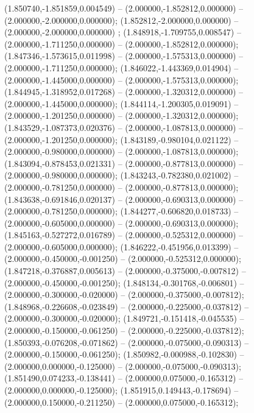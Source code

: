  (1.850740,-1.851859,0.004549) -- (2.000000,-1.852812,0.000000) -- (2.000000,-2.000000,0.000000);
 (1.852812,-2.000000,0.000000) -- (2.000000,-2.000000,0.000000) ;
 (1.848918,-1.709755,0.008547) -- (2.000000,-1.711250,0.000000) -- (2.000000,-1.852812,0.000000);
 (1.847346,-1.573615,0.011998) -- (2.000000,-1.575313,0.000000) -- (2.000000,-1.711250,0.000000);
 (1.846022,-1.443369,0.014904) -- (2.000000,-1.445000,0.000000) -- (2.000000,-1.575313,0.000000);
 (1.844945,-1.318952,0.017268) -- (2.000000,-1.320312,0.000000) -- (2.000000,-1.445000,0.000000);
 (1.844114,-1.200305,0.019091) -- (2.000000,-1.201250,0.000000) -- (2.000000,-1.320312,0.000000);
 (1.843529,-1.087373,0.020376) -- (2.000000,-1.087813,0.000000) -- (2.000000,-1.201250,0.000000);
 (1.843189,-0.980104,0.021122) -- (2.000000,-0.980000,0.000000) -- (2.000000,-1.087813,0.000000);
 (1.843094,-0.878453,0.021331) -- (2.000000,-0.877813,0.000000) -- (2.000000,-0.980000,0.000000);
 (1.843243,-0.782380,0.021002) -- (2.000000,-0.781250,0.000000) -- (2.000000,-0.877813,0.000000);
 (1.843638,-0.691846,0.020137) -- (2.000000,-0.690313,0.000000) -- (2.000000,-0.781250,0.000000);
 (1.844277,-0.606820,0.018733) -- (2.000000,-0.605000,0.000000) -- (2.000000,-0.690313,0.000000);
 (1.845163,-0.527272,0.016789) -- (2.000000,-0.525312,0.000000) -- (2.000000,-0.605000,0.000000);
 (1.846222,-0.451956,0.013399) -- (2.000000,-0.450000,-0.001250) -- (2.000000,-0.525312,0.000000);
 (1.847218,-0.376887,0.005613) -- (2.000000,-0.375000,-0.007812) -- (2.000000,-0.450000,-0.001250);
 (1.848134,-0.301768,-0.006801) -- (2.000000,-0.300000,-0.020000) -- (2.000000,-0.375000,-0.007812);
 (1.848968,-0.226608,-0.023849) -- (2.000000,-0.225000,-0.037812) -- (2.000000,-0.300000,-0.020000);
 (1.849721,-0.151418,-0.045535) -- (2.000000,-0.150000,-0.061250) -- (2.000000,-0.225000,-0.037812);
 (1.850393,-0.076208,-0.071862) -- (2.000000,-0.075000,-0.090313) -- (2.000000,-0.150000,-0.061250);
 (1.850982,-0.000988,-0.102830) -- (2.000000,0.000000,-0.125000) -- (2.000000,-0.075000,-0.090313);
 (1.851490,0.074233,-0.138441) -- (2.000000,0.075000,-0.165312) -- (2.000000,0.000000,-0.125000);
 (1.851915,0.149443,-0.178694) -- (2.000000,0.150000,-0.211250) -- (2.000000,0.075000,-0.165312);
